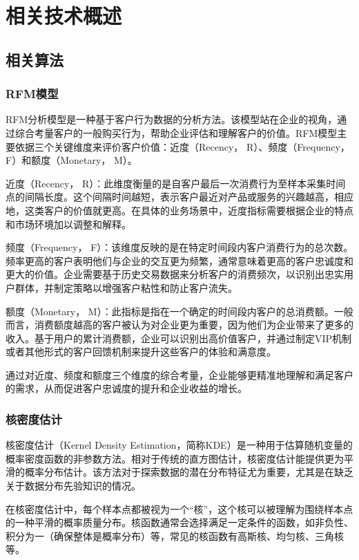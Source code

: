 \chapter{相关技术概述}
\section{相关算法}
\subsection{RFM模型}
RFM分析模型\cite{hughes2005strategic}是一种基于客户行为数据的分析方法。该模型站在企业的视角，通过综合考量客户的一般购买行为，帮助企业评估和理解客户的价值。RFM模型主要依据三个关键维度来评价客户价值：近度（Recency， R）、频度（Frequency， F）和额度（Monetary， M）。

近度（Recency， R）：此维度衡量的是自客户最后一次消费行为至样本采集时间点的间隔长度。这个间隔时间越短，表示客户最近对产品或服务的兴趣越高，相应地，这类客户的价值就更高。在具体的业务场景中，近度指标需要根据企业的特点和市场环境加以调整和解释。

频度（Frequency， F）：该维度反映的是在特定时间段内客户消费行为的总次数。频率更高的客户表明他们与企业的交互更为频繁，通常意味着更高的客户忠诚度和更大的价值。企业需要基于历史交易数据来分析客户的消费频次，以识别出忠实用户群体，并制定策略以增强客户粘性和防止客户流失。

额度（Monetary， M）：此指标是指在一个确定的时间段内客户的总消费额。一般而言，消费额度越高的客户被认为对企业更为重要，因为他们为企业带来了更多的收入。基于用户的累计消费额，企业可以识别出高价值客户，并通过制定VIP机制或者其他形式的客户回馈机制来提升这些客户的体验和满意度。

通过对近度、频度和额度三个维度的综合考量，企业能够更精准地理解和满足客户的需求，从而促进客户忠诚度的提升和企业收益的增长。
\subsection{核密度估计}
核密度估计\cite{10.1214/aoms/1177728190}（Kernel Density Estimation，简称KDE）是一种用于估算随机变量的概率密度函数的非参数方法。相对于传统的直方图估计，核密度估计能提供更为平滑的概率分布估计。该方法对于探索数据的潜在分布特征尤为重要，尤其是在缺乏关于数据分布先验知识的情况。

在核密度估计中，每个样本点都被视为一个“核”，这个核可以被理解为围绕样本点的一种平滑的概率质量分布。核函数通常会选择满足一定条件的函数，如非负性、积分为一（确保整体是概率分布）等，常见的核函数有高斯核、均匀核、三角核等。

